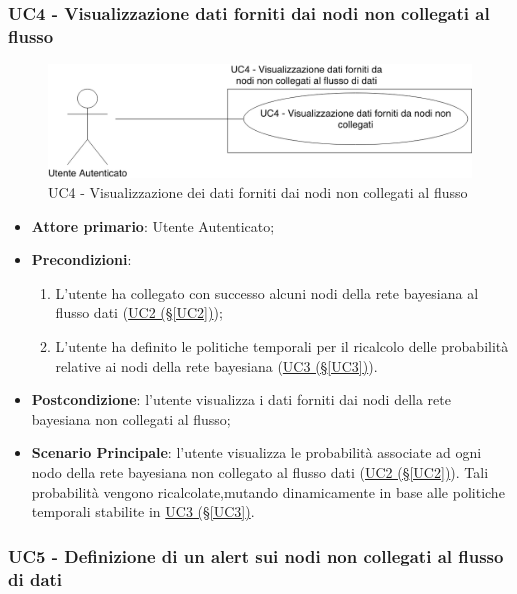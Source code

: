 \newpage
\subsubsection{UC4 - Visualizzazione dati forniti dai nodi non collegati al flusso}\label{UC4}

\begin{figure}[H]
\centering
\includegraphics[scale=0.4]{./images/UC4.png}
\caption{UC4 - Visualizzazione dei dati forniti dai nodi non collegati al flusso}
\end{figure}

\begin{itemize}
\item \textbf{Attore primario}: Utente Autenticato;
\item \textbf{Precondizioni}:
	\begin{enumerate}
	\item L'utente ha collegato con successo alcuni nodi della rete bayesiana al flusso dati (\hyperref[UC2]{UC2 (§\ref*{UC2})});
	\item L'utente ha definito le politiche temporali per il ricalcolo delle probabilità relative ai nodi della rete bayesiana (\hyperref[UC3]{UC3 (§\ref*{UC3})}).
	\end{enumerate}
\item \textbf{Postcondizione}: l'utente visualizza i dati forniti dai nodi della rete bayesiana non collegati al flusso;
\item \textbf{Scenario Principale}: l'utente visualizza le probabilità associate ad ogni nodo della rete bayesiana non collegato al flusso dati (\hyperref[UC2]{UC2 (§\ref*{UC2})}). Tali probabilità vengono ricalcolate,mutando dinamicamente in base alle politiche temporali stabilite in \hyperref[UC3]{UC3 (§\ref*{UC3})}.
\end{itemize}

\pagebreak

\subsubsection{UC5 - Definizione di un alert sui nodi non collegati al flusso di dati}\label{UC5}


